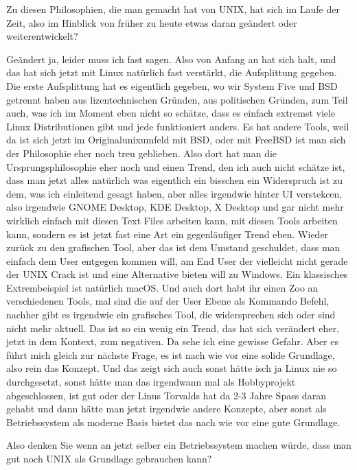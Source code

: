 \begin{description}
\DS Zu diesen Philosophien, die man gemacht hat von UNIX, hat sich im Laufe der Zeit, also im Hinblick von früher zu heute etwas daran geändert oder weiterentwickelt?
	
\NH Geändert ja, leider muss ich fast sagen. Also von Anfang an hat sich halt, und das hat sich jetzt mit Linux natürlich fast verstärkt, die Aufsplittung gegeben. Die erste Aufsplittung  hat es eigentlich gegeben, wo wir System Five und BSD getrennt haben aus lizentechnischen Gründen, aus politischen Gründen, zum Teil auch, was ich im Moment eben nicht so schätze, dass es einfach extremst viele Linux Distributionen gibt und jede funktioniert anders. Es hat andere Tools, weil da ist sich jetzt im Originalunixumfeld mit BSD, oder mit FreeBSD ist man sich der Philosophie eher noch treu geblieben. Also dort hat man die Ursprungsphilosophie eher noch und einen Trend, den ich auch nicht schätze ist, dass man jetzt alles natürlich was eigentlich ein bisschen ein Widerspruch ist zu dem, was ich einleitend gesagt haben, aber alles irgendwie hinter UI verstekcen, also irgendwie GNOME Desktop, KDE Desktop, X Desktop und gar nicht mehr wirklich einfach mit diesen Text Files arbeiten kann, mit diesen Tools arbeiten kann, sondern es ist jetzt fast eine Art ein gegenläufiger Trend eben. Wieder zurück zu den grafischen Tool, aber das ist dem Umstand geschuldet, dass man einfach dem User entgegen kommen will, am End User der vielleicht nicht gerade der UNIX Crack ist und eine Alternative bieten will zu Windows. Ein klassisches Extrembeispiel ist natürlich macOS. Und auch dort habt ihr einen Zoo an verschiedenen Tools, mal sind die auf der User Ebene als Kommando Befehl, nachher gibt es irgendwie ein grafisches Tool, die widersprechen sich oder sind nicht mehr aktuell. Das ist so ein wenig ein Trend, das hat sich verändert eher, jetzt in dem Kontext, zum negativen. Da sehe ich eine gewisse Gefahr. Aber es führt mich gleich zur nächste Frage, es ist nach wie vor eine solide Grundlage, also rein das Konzept. Und das zeigt sich auch sonst hätte isch ja Linux nie so durchgesetzt, sonst hätte man das irgendwann mal als Hobbyprojekt abgeschlossen, ist gut oder der Linus Torvalds hat da 2-3 Jahre Spass daran gehabt und dann hätte man jetzt irgendwie andere Konzepte, aber sonst als Betriebssystem als moderne Basis bietet das nach wie vor eine gute Grundlage.
		
\DS Also denken Sie wenn an jetzt selber ein Betriebssystem machen würde, dass man gut noch UNIX als Grundlage gebrauchen kann?
	

\end{description}
